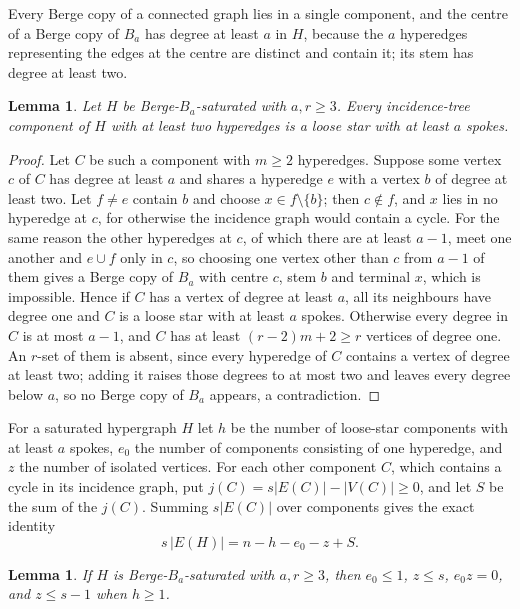 \documentclass[11pt]{article}
\newtheorem{lemma}[theorem]{Lemma}
\theoremstyle{definition}
\theoremstyle{remark}
\begin{document}
Every Berge copy of a connected graph lies in a single component, and the
centre of a Berge copy of $B_a$ has degree at least $a$ in $H$, because the
$a$ hyperedges representing the edges at the centre are distinct and contain
it; its stem has degree at least two.

\begin{lemma}\label{lem:tree}
Let $H$ be Berge-$B_a$-saturated with $a,r\ge3$. Every incidence-tree
component of $H$ with at least two hyperedges is a loose star with at least
$a$ spokes.
\end{lemma}

\begin{proof}
Let $C$ be such a component with $m\ge2$ hyperedges. Suppose some vertex
$c$ of $C$ has degree at least $a$ and shares a hyperedge $e$ with a vertex
$b$ of degree at least two. Let $f\ne e$ contain $b$ and choose
$x\in f\setminus\{b\}$; then $c\notin f$, and $x$ lies in no hyperedge at
$c$, for otherwise the incidence graph would contain a cycle. For the same
reason the other hyperedges at $c$, of which there are at least $a-1$, meet
one another and $e\cup f$ only in $c$, so choosing one vertex other than $c$
from $a-1$ of them gives a Berge copy of $B_a$
with centre $c$, stem $b$ and terminal $x$, which is impossible. Hence if
$C$ has a vertex of degree at least $a$, all its neighbours have degree one
and $C$ is a loose star with at least $a$ spokes. Otherwise every degree in
$C$ is at most $a-1$, and $C$ has at least $(r-2)m+2\ge r$ vertices of
degree one. An $r$-set of them is absent, since every hyperedge of $C$
contains a vertex of degree at least two; adding it raises those degrees to
at most two and leaves every degree below $a$, so no Berge copy of $B_a$
appears, a contradiction.
\end{proof}

For a saturated hypergraph $H$ let $h$ be the number of loose-star
components with at least $a$ spokes, $e_0$ the number of components
consisting of one hyperedge, and $z$ the number of isolated vertices. For
each other component $C$, which contains a cycle in its incidence graph,
put $j(C)=s|E(C)|-|V(C)|\ge0$, and let $S$ be the sum of the $j(C)$.
Summing $s|E(C)|$ over components gives the exact identity
\begin{equation}\label{eq:count}
s\,|E(H)|=n-h-e_0-z+S .
\end{equation}

\begin{lemma}\label{lem:small}
If $H$ is Berge-$B_a$-saturated with $a,r\ge3$, then $e_0\le1$, $z\le s$,
$e_0z=0$, and $z\le s-1$ when $h\ge1$.
\end{lemma}
\end{document}
